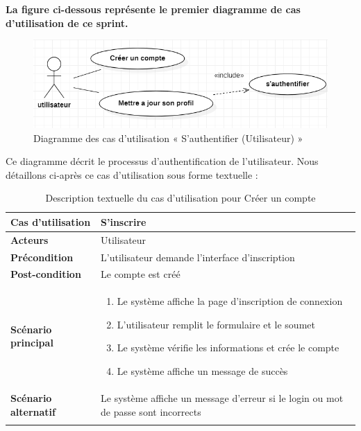 \textbf{La figure ci-dessous représente le premier diagramme de cas d'utilisation de ce sprint.}

\begin{figure}[H]
    \centering
    \includegraphics[width=0.6\linewidth]{projet/images/diagramme de sequance/images/utilisateur.png}
    \caption{Diagramme des cas d'utilisation « S'authentifier (Utilisateur) »}
    \label{fig:equipe_scrum}
\end{figure}

Ce diagramme décrit le processus d'authentification de l'utilisateur. Nous détaillons ci-après ce cas d'utilisation sous forme textuelle :

\begin{longtable}{|>{\bfseries}p{4cm}|p{10cm}|}
\hline
Cas d'utilisation & S'inscrire \\
\hline
Acteurs & Utilisateur \\
\hline
Précondition & L'utilisateur demande l'interface d'inscription \\
\hline
Post-condition & Le compte est créé \\
\hline
Scénario principal & 
\begin{enumerate}
  \item Le système affiche la page d'inscription de connexion
  \item L'utilisateur remplit le formulaire et le soumet
  \item Le système vérifie les informations et crée le compte
  \item Le système affiche un message de succès
\end{enumerate} \\
\hline
Scénario alternatif & Le système affiche un message d'erreur si le login ou mot de passe sont incorrects \\
\hline
\caption{Description textuelle du cas d'utilisation pour Créer un compte}
\end{longtable}

